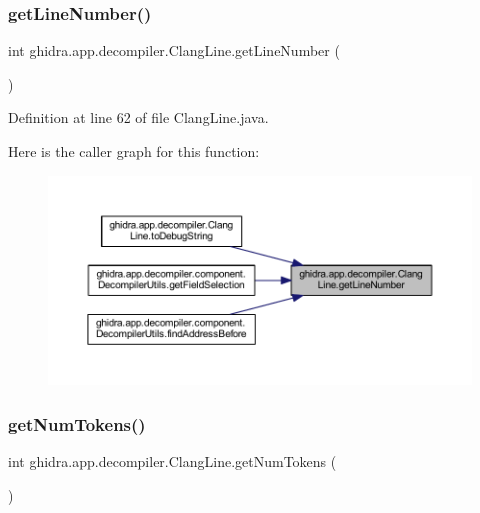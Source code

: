 \subsubsection{\texorpdfstring{getLineNumber()}{getLineNumber()}}
{\footnotesize\ttfamily int ghidra.\+app.\+decompiler.\+Clang\+Line.\+get\+Line\+Number (\begin{DoxyParamCaption}{ }\end{DoxyParamCaption})\hspace{0.3cm}{\ttfamily [inline]}}



Definition at line 62 of file Clang\+Line.\+java.

Here is the caller graph for this function\+:
\nopagebreak
\begin{figure}[H]
\begin{center}
\leavevmode
\includegraphics[width=350pt]{classghidra_1_1app_1_1decompiler_1_1_clang_line_a2e767737c1ccf21aed5c5c2dbdf7ddce_icgraph}
\end{center}
\end{figure}
\mbox{\label{classghidra_1_1app_1_1decompiler_1_1_clang_line_a3b9517c266b79f7ef7f30fa62ba28ebe}} 
\subsubsection{\texorpdfstring{getNumTokens()}{getNumTokens()}}
{\footnotesize\ttfamily int ghidra.\+app.\+decompiler.\+Clang\+Line.\+get\+Num\+Tokens (\begin{DoxyParamCaption}{ }\end{DoxyParamCaption})\hspace{0.3cm}{\ttfamily [inline]}}



